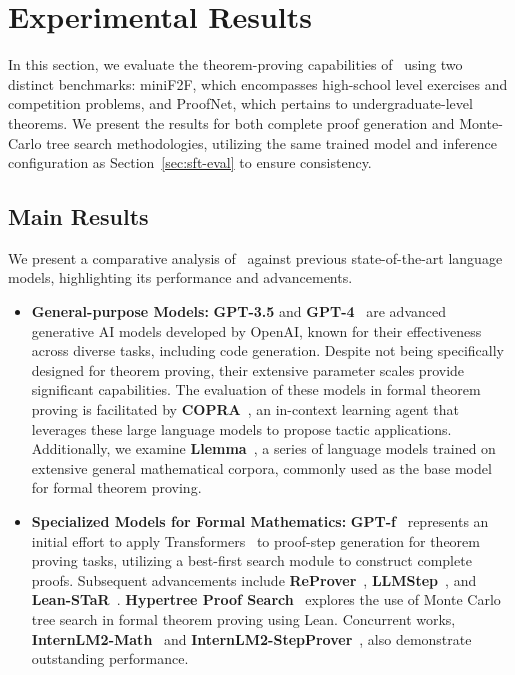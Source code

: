 \section{Experimental Results}
\label{sec:experiments}

In this section, we evaluate the theorem-proving capabilities of \thiswork~using two distinct benchmarks: miniF2F, which encompasses high-school level exercises and competition problems, and ProofNet, which pertains to undergraduate-level theorems. We present the results for both complete proof generation and Monte-Carlo tree search methodologies, utilizing the same trained model and inference configuration as Section~\ref{sec:sft-eval} to ensure consistency.

\subsection{Main Results}

We present a comparative analysis of \thiswork~against previous state-of-the-art language models, highlighting its performance and advancements.


\begin{itemize}
    \item \textbf{General-purpose Models:} \textbf{GPT-3.5} and \textbf{GPT-4}~\citep{OpenAI} are advanced generative AI models developed by OpenAI, known for their effectiveness across diverse tasks, including code generation. Despite not being specifically designed for theorem proving, their extensive parameter scales provide significant capabilities. The evaluation of these models in formal theorem proving is facilitated by \textbf{COPRA}~\citep{thakur2023language}, an in-context learning agent that leverages these large language models to propose tactic applications. Additionally, we examine \textbf{Llemma}~\citep{azerbayev2024llemma}, a series of language models trained on extensive general mathematical corpora, commonly used as the base model for formal theorem proving.

    \item \textbf{Specialized Models for Formal Mathematics:} \textbf{GPT-f}~\citep{polu2020generative, polu2022formal} represents an initial effort to apply Transformers~\citep{vaswani2017attention} to proof-step generation for theorem proving tasks, utilizing a best-first search module to construct complete proofs. Subsequent advancements include \textbf{ReProver}~\citep{yang2024leandojo}, \textbf{LLMStep}~\citep{welleck23llmstep}, and \textbf{Lean-STaR}~\citep{lin2024lean}. \textbf{Hypertree Proof Search}~\citep{lample2022hypertree} explores the use of Monte Carlo tree search in formal theorem proving using Lean. Concurrent works, \textbf{InternLM2-Math}~\citep{ying2024internlm} and \textbf{InternLM2-StepProver}~\citep{wu2024lean}, also demonstrate outstanding performance.
\end{itemize}



